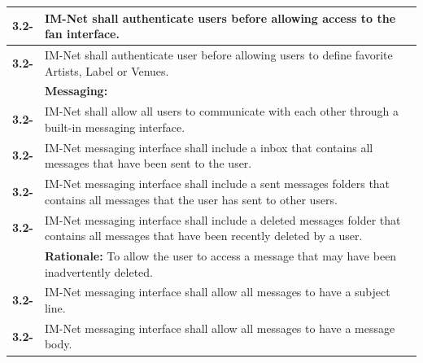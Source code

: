 \documentclass[letterpaper,12pt]{article}
\newcounter{rcounter}							%
\newcommand\rnumber{\stepcounter{rcounter}\arabic{rcounter}}
\begin{document}
{\begin{center}
\begin{tabular}{|l|p{6in}|}
\hline 
\textbf{3.2-\rnumber} & IM-Net shall authenticate users before allowing access to the fan interface. \\ 
\hline 
\textbf{3.2-\rnumber} & IM-Net shall authenticate user before allowing users to define favorite Artists, Label or Venues. \\ 
\hline 
& \textbf{Messaging:} \\
\hline
\textbf{3.2-\rnumber} & IM-Net shall allow all users to communicate with each other through a built-in messaging interface. \\ 
\hline 
\textbf{3.2-\rnumber} & IM-Net messaging interface shall include a inbox that contains all messages that have been sent to the user. \\ 
\hline 
\textbf{3.2-\rnumber} & IM-Net messaging interface shall include a sent messages folders that contains all messages that the user has sent to other users.  \\ 
\hline 
\textbf{3.2-\rnumber} & IM-Net messaging interface shall include a deleted messages folder that contains all messages that have been recently deleted by a user. \\ 
& \textbf{Rationale:} To allow the user to access a message that may have been inadvertently deleted. \\
\hline 
\textbf{3.2-\rnumber} & IM-Net messaging interface shall allow all messages to have a subject line. \\ 
\hline 
\textbf{3.2-\rnumber} & IM-Net messaging interface shall allow all messages to have a message body.  \\ 
\hline 



\end{tabular} 
\end{center}

}
\end{document}

